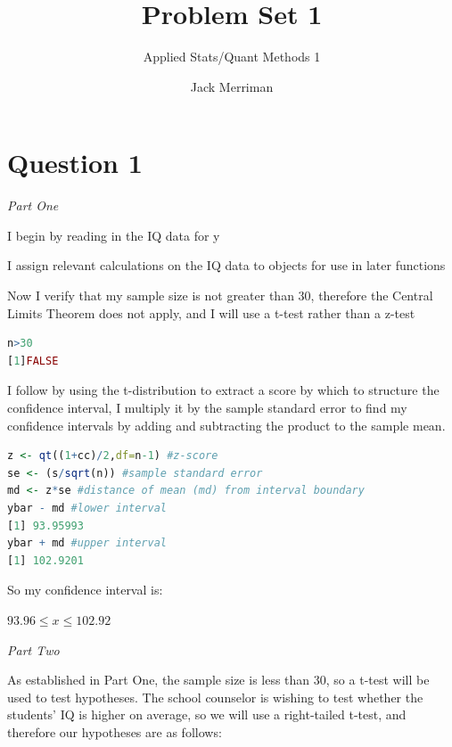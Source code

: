 \documentclass[12pt,letterpaper]{article}
\title{Problem Set 1}
\date{Jack Merriman}
\author{Applied Stats/Quant Methods 1}
\begin{document}
	\maketitle
	
\section*{Question 1 }

\textit{Part One}\\ 

\vspace{.25cm}

\noindent I begin by reading in the IQ data for y

 

\noindent I assign relevant calculations on the IQ data to objects for use in later functions

 

\noindent Now I verify that my sample size is not greater than 30, therefore the Central Limits Theorem does not apply, and I will use a t-test rather than a z-test

\begin{lstlisting}[language=R]
n>30
[1]FALSE
\end{lstlisting}

\noindent I follow by using the t-distribution to extract a score by which to structure the confidence interval, I multiply it by the sample standard error to find my confidence intervals by adding and subtracting the product to the sample mean. 

\begin{lstlisting}[language=R]
z <- qt((1+cc)/2,df=n-1) #z-score
se <- (s/sqrt(n)) #sample standard error
md <- z*se #distance of mean (md) from interval boundary
ybar - md #lower interval
[1] 93.95993
ybar + md #upper interval
[1] 102.9201
\end{lstlisting}

\noindent So my confidence interval is: 

$93.96 \leq x \leq 102.92$

\clearpage

\noindent \textit{Part Two}\\ 

\vspace{.25cm}

\noindent As established in Part One, the sample size is less than 30, so a t-test will be used to test hypotheses. The school counselor is wishing to test whether the students' IQ is higher on average, so we will use a right-tailed t-test, and therefore our hypotheses are as follows:
\end{document}
